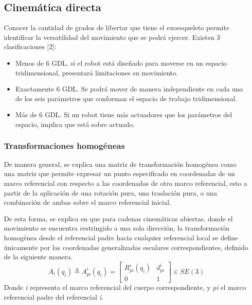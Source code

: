 \subsection{Cinemática directa}
    \noindent Conocer la cantidad de grados de libertar que tiene el exoesqueleto permite identificar 
    la versatilidad del movimiento que se podrá ejercer. Existen 3 clasificaciones [2]:

    \begin{itemize}
        \item Menos de 6 GDL.  si el robot está diseñado para moverse en un espacio tridimensional, presentará  limitaciones su movimiento. 
        \item Exactamente 6 GDL. Se podrá mover de manera independiente en cada uno de los seis parámetros que conforman el espacio de trabajo tridimensional.
        \item Más de 6 GDL. Si un robot tiene más actuadores que los parámetros del espacio, implica que está sobre actuado.
    \end{itemize}

    \subsubsection{Transformaciones homogéneas}
        \noindent De manera general, se explica una matriz de transformación homogénea como una
        matriz que permite expresar un punto especificado en coordenadas de
        un marco referencial con respecto a las coordenadas de otro marco 
        referencial, esto a partir de la aplicación de una rotación pura, 
        una traslación pura, o una combinación de ambas sobre el marco referencial
        inicial.

        De esta forma, se explica en \cite{3DMotion} que para cadenas cinemáticas abiertas, 
        donde el movimiento se encuentra restringido a una sola dirección, la 
        transformación homogénea desde el referencial padre hacia cualquier referencial 
        local se define únicamente por las coordenadas generalizadas escalares 
        correspondientes, definido de la siguiente manera.
        \begin{equation*} 
            A_i(q_i) \triangleq A^i_{pi}(q_i) =
            \begin{bmatrix}
                R^i_{pi}(q_i) & d^i_{pi}\\
                0 & 1
            \end{bmatrix}
            \in SE(3)
        \end{equation*}
        Donde \emph{i} representa el marco referencial del cuerpo
        correspondiente, y \emph{pi} el marco referencial padre del 
        referencial \emph{i}.

